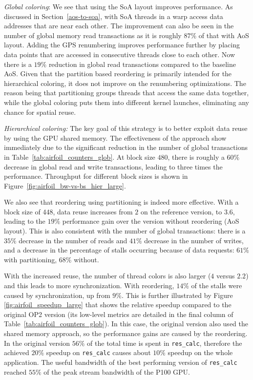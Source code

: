 \emph{Global coloring}: We see that using the SoA layout improves performance. 
As discussed in Section~\ref{aos-to-soa}, with SoA threads in a warp access data 
addresses that are near each other. The improvement can also be seen in 
the number of global memory read transactions as it is roughly $87\%$ of that 
with AoS layout. Adding the GPS renumbering improves performance 
further by placing data points that are accessed in consecutive threads close 
to each other. Now there is a $19\%$ reduction in global read transactions 
compared to the baseline AoS. Given that the partition based reordering is 
primarily intended for the hierarchical coloring, it does not improve on the 
renumbering optimizations. The reason being that partitioning groups threads 
that access the same data together, while the global coloring puts them into 
different kernel launches, eliminating any chance for spatial reuse.

\emph{Hierarchical coloring:}  The key goal of this strategy is to better 
exploit data reuse by using the GPU shared memory. The effectiveness of the 
approach show immediately due to the significant reduction in the number of 
global transactions in Table~\ref{tab:airfoil_counters_glob}. At block size 
$480$, there is roughly a $60\%$ decrease in global read and write 
transactions, leading to three times the performance. Throughput for different 
block sizes is shown in Figure~\ref{fig:airfoil_bw-vs-bs_hier_large}.

We also see that reordering using partitioning is indeed more effective. With
a block size of 448, data reuse increases from $2$ on the reference version,
to $3.6$, leading to the $19\%$ performance gain over the version without
reordering (AoS layout). This is also consistent with the number of global
transactions: there is a $35\%$ decrease in the number of reads and $41\%$
decrease in the number of writes, and a decrease in the percentage of stalls
occurring because of data requests: $61\%$ with partitioning, $68\%$ without.

With the increased reuse, the number of thread colors is also larger ($4$
versus $2.2$) and this leads to more synchronization. With reordering, $14\%$
of the stalls were caused by synchronization, up from $9\%$. This is further 
illustrated by Figure \ref{fig:airfoil_speedup_large} that shows the relative 
speedup compared to the original OP2 version (its low-level metrics are detailed 
in the final column of Table~\ref{tab:airfoil_counters_glob}). In this case, the 
original version also used the shared memory approach, so the performance gains 
are caused by the reordering. In the original version $56\%$ of the total time 
is spent in \texttt{res\_calc}, therefore the achieved $20\%$ speedup on 
\texttt{res\_calc} causes about $10\%$ speedup on the whole application. 
The useful bandwidth of the best performing version of \texttt{res\_calc} 
 reached $55\%$ of the peak stream bandwidth of the P100 GPU. %


